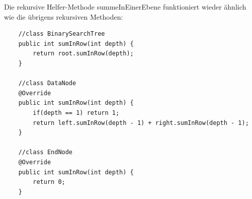 \documentclass{article}
\begin{document}
Die rekursive Helfer-Methode summeInEinerEbene funktioniert wieder ähnlich wie die übrigens rekursiven Methoden: 
\begin{verbatim}
    //class BinarySearchTree
    public int sumInRow(int depth) {
        return root.sumInRow(depth);
    }

    //class DataNode 
    @Override 
    public int sumInRow(int depth) {
        if(depth == 1) return 1;
        return left.sumInRow(depth - 1) + right.sumInRow(depth - 1);
    } 

    //class EndNode 
    @Override 
    public int sumInRow(int depth) {
        return 0;
    }
\end{verbatim}
\end{document}
